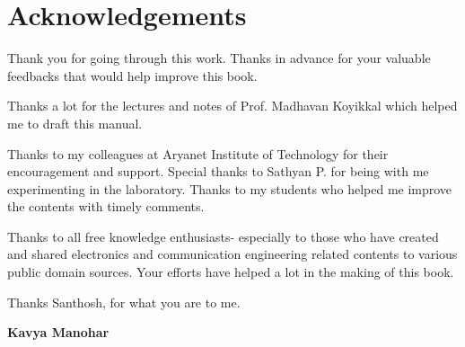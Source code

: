\chapter*{Acknowledgements}

Thank you for going through this work. Thanks in advance for your valuable feedbacks that would help improve this book.

Thanks a lot for the lectures and notes of Prof. Madhavan Koyikkal which helped me to draft this manual.

Thanks to my colleagues at Aryanet Institute of Technology for their encouragement and support. Special thanks to Sathyan P. for being with me experimenting in the laboratory. Thanks to my students who helped me improve the contents with timely comments.

Thanks to all free knowledge enthusiasts- especially to those who have created and shared electronics and communication engineering related contents to various public domain sources. Your efforts have helped a lot in the making of this book.

Thanks Santhosh, for what you are to me.

\begin{flushright}
\textbf{Kavya Manohar}
\end{flushright}

